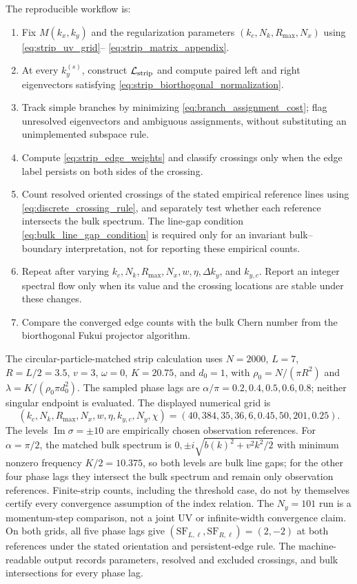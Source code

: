 \documentclass[11pt]{article}
\numberwithin{equation}{section}
\begin{document}
The reproducible workflow is:
\begin{enumerate}[label=\arabic*.]
  \item Fix $M(k_x,k_y)$ and the regularization parameters
  $(k_c,N_k,R_{\max},N_x)$ using \eqref{eq:strip_uv_grid}--
  \eqref{eq:strip_matrix_appendix}.
  \item At every $k_y^{(s)}$, construct $\mathcal L_{\rm strip}$ and compute
  paired left and right eigenvectors satisfying
  \eqref{eq:strip_biorthogonal_normalization}.
  \item Track simple branches by minimizing
  \eqref{eq:branch_assignment_cost}; flag unresolved eigenvectors and
  ambiguous assignments, without substituting an unimplemented subspace rule.
  \item Compute \eqref{eq:strip_edge_weights} and classify crossings only
  when the edge label persists on both sides of the crossing.
  \item Count resolved oriented crossings of the stated empirical reference
  lines using \eqref{eq:discrete_crossing_rule}, and separately test whether
  each reference intersects the bulk spectrum. The line-gap condition
  \eqref{eq:bulk_line_gap_condition} is required only for an invariant
  bulk--boundary interpretation, not for reporting these empirical counts.
  \item Repeat after varying $k_c,N_k,R_{\max},N_x,w,\eta,\Delta k_y$, and
  $k_{y,c}$.  Report an integer spectral flow only when its value and the
  crossing locations are stable under these changes.
  \item Compare the converged edge counts with the bulk Chern number from
  the biorthogonal Fukui projector algorithm.
\end{enumerate}
The circular-particle-matched strip calculation uses
$N=2000$, $L=7$, $R=L/2=3.5$, $v=3$, $\omega=0$, $K=20.75$, and $d_0=1$,
with $\rho_0=N/(\pi R^2)$ and $\lambda=K/(\rho_0\pi d_0^2)$.
The sampled phase lags are $\alpha/\pi=0.2,0.4,0.5,0.6,0.8$; neither
singular endpoint is evaluated. The displayed numerical grid is
\begin{equation}
  (k_c,N_k,R_{\max},N_x,w,\eta,k_{y,c},N_y,\chi)
  =(40,384,35,36,6,0.45,50,201,0.25).
  \label{eq:strip_reproduction_parameters}
\end{equation}
The levels $\operatorname{Im}\sigma=\pm10$ are empirically chosen observation
references. For $\alpha=\pi/2$, the matched bulk spectrum is
$0,\pm i\sqrt{b(k)^2+v^2k^2/2}$ with minimum nonzero frequency
$K/2=10.375$, so both levels are bulk line gaps; for the other four phase
lags they intersect the bulk spectrum and remain only observation references.
Finite-strip counts, including the threshold case, do not by themselves
certify every convergence assumption of the index relation. The $N_y=101$
run is a momentum-step comparison, not a joint UV or infinite-width convergence
claim. On both grids, all five phase lags give
$(\mathrm{SF}_{L,\ell},\mathrm{SF}_{R,\ell})=(2,-2)$ at both references under
the stated orientation and persistent-edge rule. The machine-readable output
records parameters, resolved and excluded crossings, and bulk intersections
for every phase lag.
\end{document}
